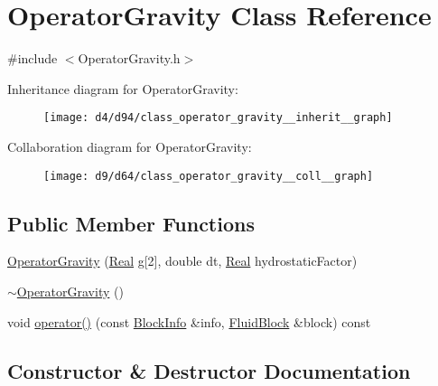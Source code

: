 \hypertarget{class_operator_gravity}{}\section{Operator\+Gravity Class Reference}
\label{class_operator_gravity}


{\ttfamily \#include $<$Operator\+Gravity.\+h$>$}



Inheritance diagram for Operator\+Gravity\+:\nopagebreak
\begin{figure}[H]
\begin{center}
\leavevmode
\texttt{[image: d4/d94/class\_operator\_gravity\_\_inherit\_\_graph]}
\end{center}
\end{figure}


Collaboration diagram for Operator\+Gravity\+:\nopagebreak
\begin{figure}[H]
\begin{center}
\leavevmode
\texttt{[image: d9/d64/class\_operator\_gravity\_\_coll\_\_graph]}
\end{center}
\end{figure}
\subsection*{Public Member Functions}
\begin{DoxyCompactItemize}
\item 
\hyperlink{class_operator_gravity_a3c5e4b3a171dab9dac4606a667252018}{Operator\+Gravity} (\hyperlink{_h_d_f5_dumper_8h_a445a5f0e2a34c9d97d69a3c2d1957907}{Real} g\mbox{[}2\mbox{]}, double dt, \hyperlink{_h_d_f5_dumper_8h_a445a5f0e2a34c9d97d69a3c2d1957907}{Real} hydrostatic\+Factor)
\item 
\hyperlink{class_operator_gravity_a30a6b4f54bfd10d91064d5e48183038e}{$\sim$\+Operator\+Gravity} ()
\item 
void \hyperlink{class_operator_gravity_a7829a016bf4b27c2213493e363515c90}{operator()} (const \hyperlink{struct_block_info}{Block\+Info} \&info, \hyperlink{struct_fluid_block}{Fluid\+Block} \&block) const 
\end{DoxyCompactItemize}


\subsection{Constructor \& Destructor Documentation}
\hypertarget{class_operator_gravity_a3c5e4b3a171dab9dac4606a667252018}{}
